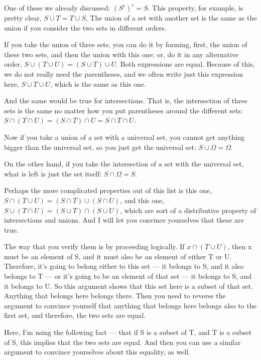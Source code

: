 \documentclass[pdftex, brazil, 12pt, twoside]{article}
\begin{document}
One of these we already discussed: $(S^c)^c = S$.
This property, for example, is pretty clear, $S \cup T = T \cup S$,
The union of a set with another set is the same as the
union if you consider the two sets in different orders.

If you take the union of three sets, you can do it by
forming, first, the union of these two sets, and then the
union with this one; or, do it in any alternative order,
$S \cup (T \cup U) = (S \cup T) \cup U$.
Both expressions are equal.
Because of this, we do not really need the parentheses,
and we often write just this expression here, $S \cup T \cup U$, which is the
same as this one.

And the same would be true for intersections.
That is, the intersection of three sets is the same no
matter how you put parentheses around the different sets:
$S \cap (T \cap U) = (S \cap T) \cap U = S \cap T \cap U$.

Now if you take a union of a set with a universal set, you
cannot get anything bigger than the universal set, so you
just get the universal set: $S \cup \Omega = \Omega$.

On the other hand, if you take the intersection of a set with
the universal set, what is left is just the set itself: $S \cap \Omega = S$.

Perhaps the more complicated properties out of this list is
this one, $S \cap (T \cup U) = (S \cap T) \cup (S \cap U)$,
and this one, $S \cup (T \cap U) = (S \cup T) \cap (S \cup U)$,
which are sort of a distributive
property of intersections and unions.
And I will let you convince yourselves
that these are true.

The way that you verify them is by proceeding logically.
If $x \cap (T \cup U)$, then x must be an element of
S, and it must also be an element of either T or U.
Therefore, it's going to belong either to this set ---
it belongs to S, and it also belongs to T --- or it's going
to be an element of that set --- it belongs to S, and it
belongs to U.
So this argument shows that this set here is a
subset of that set.
Anything that belongs here belongs there.
Then you need to reverse the argument to convince yourself
that anything that belongs here belongs also to the first
set, and therefore, the two sets are equal.

Here, I'm using the following fact --- that if S is a subset
of T, and T is a subset of S, this implies that the
two sets are equal.
And then you can use a similar argument to convince
yourselves about this equality, as well.
\end{document}
